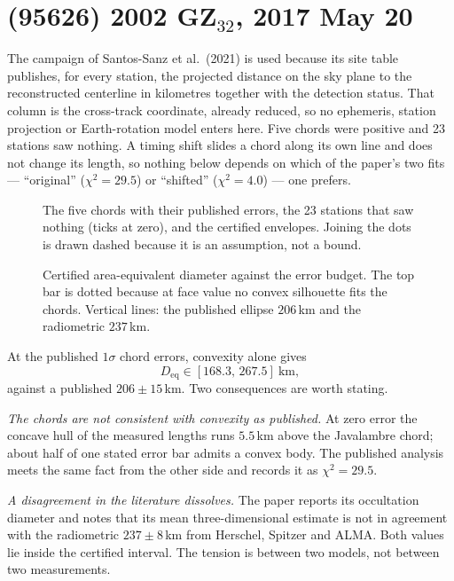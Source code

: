 \documentclass[11pt]{article}
\begin{document}
\section{(95626) 2002 GZ$_{32}$, 2017 May 20}

The campaign of Santos-Sanz et al.\ (2021) is used because its site table
publishes, for every station, the projected distance on the sky plane to the
reconstructed centerline in kilometres together with the detection status. That
column is the cross-track coordinate, already reduced, so no ephemeris, station
projection or Earth-rotation model enters here. Five chords were positive and 23
stations saw nothing. A timing shift slides a chord along its own line and does
not change its length, so nothing below depends on which of the paper's two fits
--- ``original'' ($\chi^2=29.5$) or ``shifted'' ($\chi^2=4.0$) --- one prefers.

\begin{figure}[t]\centering\figEnvelope
\caption{The five chords with their published errors, the 23 stations that saw
nothing (ticks at zero), and the certified envelopes. Joining the dots is drawn
dashed because it is an assumption, not a bound.}\end{figure}

\begin{figure}[t]\centering\figLadder
\caption{Certified area-equivalent diameter against the error budget. The top
bar is dotted because at face value no convex silhouette fits the chords.
Vertical lines: the published ellipse $206$\,km and the radiometric
$237$\,km.}\end{figure}

At the published $1\sigma$ chord errors, convexity alone gives
\[
D_{\mathrm{eq}}\in[168.3,\,267.5]\ \mathrm{km},
\]
against a published $206\pm15$\,km. Two consequences are worth stating.

\emph{The chords are not consistent with convexity as published.} At zero error
the concave hull of the measured lengths runs $5.5$\,km above the Javalambre
chord; about half of one stated error bar admits a convex body. The published
analysis meets the same fact from the other side and records it as
$\chi^2=29.5$.

\emph{A disagreement in the literature dissolves.} The paper reports its
occultation diameter and notes that its mean three-dimensional estimate is not in
agreement with the radiometric $237\pm8$\,km from Herschel, Spitzer and ALMA.
Both values lie inside the certified interval. The tension is between two
models, not between two measurements.
\end{document}
